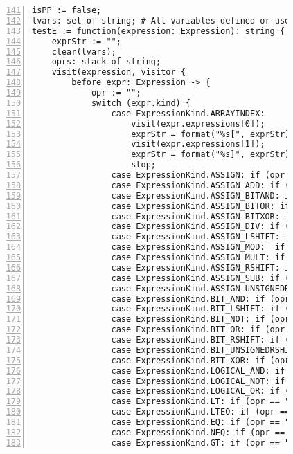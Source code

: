 \begin{figure}[ht!]
\begin{lstlisting}[numbers=left, tabsize=4, escapechar=@, caption={API Usage Mining Analysis},label={lst:aun-code},  firstline = 141, firstnumber = 141, lastline = 201]
isPP := false;
lvars: set of string; # All variables defined or used in a node
testE := function(expression: Expression): string {
    exprStr := "";
    clear(lvars);
    oprs: stack of string;
    visit(expression, visitor {
        before expr: Expression -> {
            opr := "";
            switch (expr.kind) {
                case ExpressionKind.ARRAYINDEX:
                    visit(expr.expressions[0]);
                    exprStr = format("%s[", exprStr);
                    visit(expr.expressions[1]);
                    exprStr = format("%s]", exprStr);
                    stop;
                case ExpressionKind.ASSIGN: if (opr == "") opr = "="; 
                case ExpressionKind.ASSIGN_ADD: if (opr == "") opr = "+="; 
                case ExpressionKind.ASSIGN_BITAND: if (opr == "") opr = "&="; 
                case ExpressionKind.ASSIGN_BITOR: if (opr == "") opr = "|="; 
                case ExpressionKind.ASSIGN_BITXOR: if (opr == "") opr = "^="; 
                case ExpressionKind.ASSIGN_DIV: if (opr == "") opr = "/="; 
                case ExpressionKind.ASSIGN_LSHIFT: if (opr == "") opr = "<<="; 
                case ExpressionKind.ASSIGN_MOD:  if (opr == "") opr = "%="; 
                case ExpressionKind.ASSIGN_MULT: if (opr == "") opr = "*="; 
                case ExpressionKind.ASSIGN_RSHIFT: if (opr == "") opr = ">>="; 
                case ExpressionKind.ASSIGN_SUB: if (opr == "") opr = "-="; 
                case ExpressionKind.ASSIGN_UNSIGNEDRSHIFT: if (opr == "") opr = ">>>="; 
                case ExpressionKind.BIT_AND: if (opr == "") opr = "&"; 
                case ExpressionKind.BIT_LSHIFT: if (opr == "") opr = "<<"; 
                case ExpressionKind.BIT_NOT: if (opr == "") opr = "~"; 
                case ExpressionKind.BIT_OR: if (opr == "") opr = "|"; 
                case ExpressionKind.BIT_RSHIFT: if (opr == "") opr = ">>"; 
                case ExpressionKind.BIT_UNSIGNEDRSHIFT: if (opr == "") opr = ">>>"; 
                case ExpressionKind.BIT_XOR: if (opr == "") opr = "^"; 
                case ExpressionKind.LOGICAL_AND: if (opr == "") opr = "&&"; 
                case ExpressionKind.LOGICAL_NOT: if (opr == "") opr = "!";
                case ExpressionKind.LOGICAL_OR: if (opr == "") opr = "||";
                case ExpressionKind.LT: if (opr == "") opr = "<";
                case ExpressionKind.LTEQ: if (opr == "") opr = "<="; 
                case ExpressionKind.EQ: if (opr == "") opr = "==";
                case ExpressionKind.NEQ: if (opr == "") opr = "!=";
                case ExpressionKind.GT: if (opr == "") opr = ">";

\end{lstlisting}
\end{figure}
